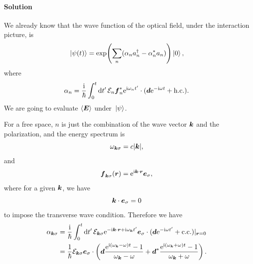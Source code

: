 \documentclass[hyperref, a4paper]{article}
\newcommand*{\ii}{\mathrm{i}}
\newcommand*{\ee}{\mathrm{e}}
\begin{document}
\paragraph{Solution} We already know that the wave function of the optical field, under the interaction picture, is 
\begin{equation}
    \ket*{\psi(t)} = \exp(\sum_n (\alpha_n a_n^\dagger - \alpha_n^* a_n) ) \ket*{0},
\end{equation}
where 
\begin{equation}
    \alpha_n = \frac{\ii}{\hbar} \int_0^t \dd{t'} \mathcal{E}_n \vb*{f}_n^* \ee^{\ii \omega_n t'} \cdot (\vb*{d} \ee^{- \ii \omega t} + \text{h.c.}).
\end{equation}
We are going to evaluate $\expval{\vb*{E}}$ under $\ket*{\psi}$.

For a free space, $n$ is just the combination of the wave vector $\vb*{k}$ and the polarization, and the energy spectrum is
\begin{equation}
    \omega_{\vb*{k} \sigma} = c \abs{\vb*{k}},
\end{equation}
and 
\begin{equation}
    \vb*{f}_{\vb*{k} \sigma}(\vb*{r}) = \ee^{\ii \vb*{k} \cdot \vb*{r}} \vb*{e}_\sigma,
\end{equation}
where for a given $\vb*{k}$, we have
\begin{equation}
    \vb*{k} \cdot \vb*{e}_\sigma = 0
\end{equation}
to impose the transverse wave condition. Therefore we have
\begin{equation}
    \begin{aligned}
        \alpha_{\vb*{k} \sigma} &= \frac{\ii}{\hbar} \int_0^t \dd{t'} \mathcal{E}_{\vb*{k} \sigma} \ee^{- \ii \vb*{k} \cdot \vb*{r} + \ii \omega_{\vb*{k}} t'} \vb*{e}_\sigma \cdot (\vb*{d} \ee^{- \ii \omega t'} + \text{c.c.}) |_{\vb*{r} = 0} \\
        &= \frac{1}{\hbar} \mathcal{E}_{\vb*{k} \sigma} \vb*{e}_\sigma \cdot  \left( \vb*{d} \frac{\ee^{\ii (\omega_{\vb*{k}} - \omega) t} - 1}{\omega_{\vb*{k}} - \omega} + \vb*{d}^* \frac{\ee^{\ii (\omega_{\vb*{k}} + \omega) t} - 1}{\omega_{\vb*{k}} + \omega} \right).
    \end{aligned}
    \label{eq:alpha-ksigma-plane}
\end{equation} 
\end{document}
